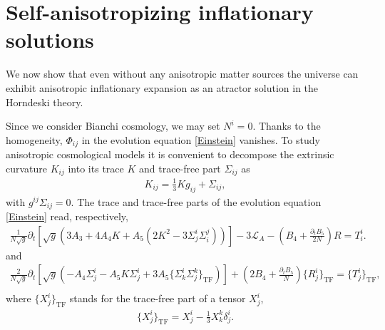 \documentclass[aps,prd,preprint,superscriptaddress,nofootinbib,tightenlines]{revtex4-1}
\begin{document}
\section{Self-anisotropizing inflationary solutions}\label{newsolution}

We now show that even without any anisotropic matter sources
the universe can exhibit anisotropic inflationary expansion as an atractor solution
in the Horndeski theory.

Since we consider Bianchi cosmology, we may set $N^i=0$.
Thanks to the homogeneity, $\Phi_{ij}$ in the evolution
equation \eqref{Einstein} vanishes.
To study anisotropic cosmological models it is convenient to
decompose the extrinsic curvature $K_{ij}$ into its trace $K$ and trace-free part $\Sigma_{ij}$
as
\begin{eqnarray}
K_{ij} = \frac{1}{3} K g_{ij} + \Sigma_{ij} ,
\end{eqnarray}
with $g^{ij} \Sigma_{ij}=0$.
The trace and trace-free parts of the evolution equation \eqref{Einstein} read,
respectively,
\begin{eqnarray}
\frac{1}{ N\sqrt{g} } \partial_t
[
\sqrt{g}
(
3 A_3 + 4 A_4 K + A_5 (2 K^2- 3\Sigma^i_j\Sigma^j_i )
)
]
- 3 \mathcal{L}_A
- \left( B_4 + \frac{\partial_t B_5}{2N} \right) R
=T^i_i . \label{tracepart}
\end{eqnarray}
and
\begin{eqnarray}
\frac{2}{N\sqrt{g}} \partial_t
\left[
\sqrt{g} (-A_4 \Sigma^i_j - A_5 K \Sigma^i_j + 3 A_5 \{ \Sigma^i_k \Sigma^k_j \}_\mathrm{TF})
\right]
+
\left(2 B_4 + \frac{\partial_t B_5}{N} \right) \{ R^i_j \}_\mathrm{TF}
=
\{ T^i_j \}_\mathrm{TF} ,
\nonumber\\
 \label{tracefree}
\end{eqnarray}
where $\{ X^i_j \}_\mathrm{TF}$ stands for the trace-free part of a tensor $X^i_j$,
\begin{eqnarray}
\{ X^i_j \}_\mathrm{TF} = X^i_j - \frac{1}{3} X^k_k \delta^i_j .
\end{eqnarray}
\end{document}
